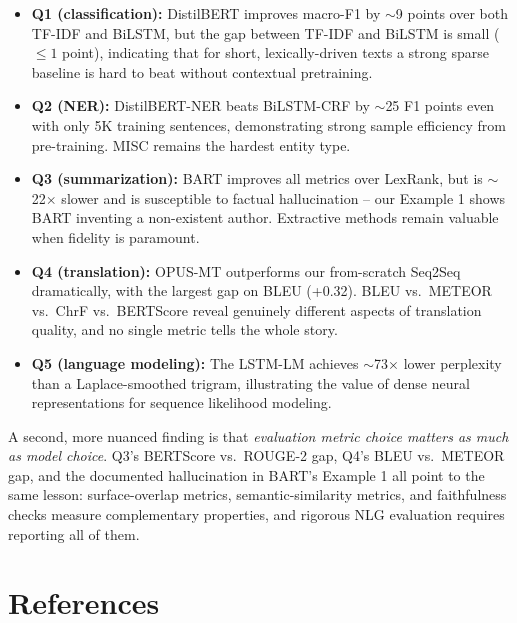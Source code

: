 \documentclass[11pt,a4paper]{article}
\begin{document}
\vspace{-0.3em}
\begin{itemize}[noitemsep,leftmargin=1.4em]
    \item \textbf{Q1 (classification):} DistilBERT improves macro-F1 by $\sim$9 points over both TF-IDF and BiLSTM, but the gap between TF-IDF and BiLSTM is small ($\leq 1$ point), indicating that for short, lexically-driven texts a strong sparse baseline is hard to beat without contextual pretraining.
    \item \textbf{Q2 (NER):} DistilBERT-NER beats BiLSTM-CRF by $\sim$25 F1 points even with only 5K training sentences, demonstrating strong sample efficiency from pre-training. MISC remains the hardest entity type.
    \item \textbf{Q3 (summarization):} BART improves all metrics over LexRank, but is $\sim$22$\times$ slower and is susceptible to factual hallucination -- our Example 1 shows BART inventing a non-existent author. Extractive methods remain valuable when fidelity is paramount.
    \item \textbf{Q4 (translation):} OPUS-MT outperforms our from-scratch Seq2Seq dramatically, with the largest gap on BLEU (+0.32). BLEU vs.\ METEOR vs.\ ChrF vs.\ BERTScore reveal genuinely different aspects of translation quality, and no single metric tells the whole story.
    \item \textbf{Q5 (language modeling):} The LSTM-LM achieves $\sim$73$\times$ lower perplexity than a Laplace-smoothed trigram, illustrating the value of dense neural representations for sequence likelihood modeling.
\end{itemize}
\vspace{-0.3em}

A second, more nuanced finding is that \emph{evaluation metric choice matters as much as model choice}. Q3's BERTScore vs.\ ROUGE-2 gap, Q4's BLEU vs.\ METEOR gap, and the documented hallucination in BART's Example 1 all point to the same lesson: surface-overlap metrics, semantic-similarity metrics, and faithfulness checks measure complementary properties, and rigorous NLG evaluation requires reporting all of them.

\section*{References}
\end{document}
